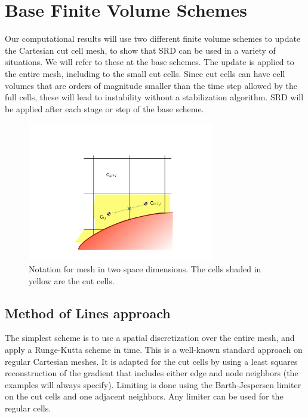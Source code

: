 \section{Base Finite Volume Schemes}\label{sec:basefv}

Our computational results will use two different finite volume schemes
to update the Cartesian cut cell mesh, to show that SRD can be used in a
variety of situations.
We will refer to these at the base schemes. 
The  update is applied to the entire mesh, including  
to the small cut cells.  Since cut cells can have cell volumes that are
orders of magnitude smaller than the time step allowed by the full
cells, these will lead to instability without a stabilization algorithm.
SRD will be applied after each stage or step of the base scheme.

\begin{figure}
\begin{center}
\includegraphics[width=3.2in]{figs/2dfig.pdf}
\caption{\sf Notation for mesh in two space dimensions. The cells shaded
in yellow are the cut cells.} 
\label{fig:2dfig}
\end{center}
\end{figure}

\subsection{Method of Lines approach}
The simplest scheme is to use a spatial discretization over the entire
mesh, and apply a Runge-Kutta scheme in time. This is a well-known
standard approach
on regular Cartesian meshes. It is adapted for the cut cells by
using a least squares reconstruction of the gradient that includes
either edge and node neighbors (the examples will always specify).
Limiting is done using the Barth-Jespersen limiter \cite{} 
on the cut cells and one adjacent neighbors. Any limiter
can be used for the regular cells.

